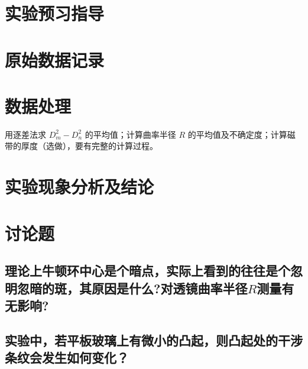 \documentclass[signature=data]{physicsreport}
\begin{document}
\maketitle

\section{实验预习指导}
\newpage

\section{原始数据记录}
\makeatletter
{}
\makeatother

\newpage

\section{数据处理}
用逐差法求 $D^2_m - D^2_n$ 的平均值；计算曲率半径 $R$ 的平均值及不确定度；计算磁带的厚度（选做），要有完整的计算过程。



\newpage

\section{实验现象分析及结论}

\section{讨论题}



\subsection{理论上牛顿环中心是个暗点，实际上看到的往往是个忽明忽暗的斑，其原因是什么?对透镜曲率半径$R$测量有无影响?}

\subsection{实验中，若平板玻璃上有微小的凸起，则凸起处的干涉条纹会发生如何变化？}
\end{document}
